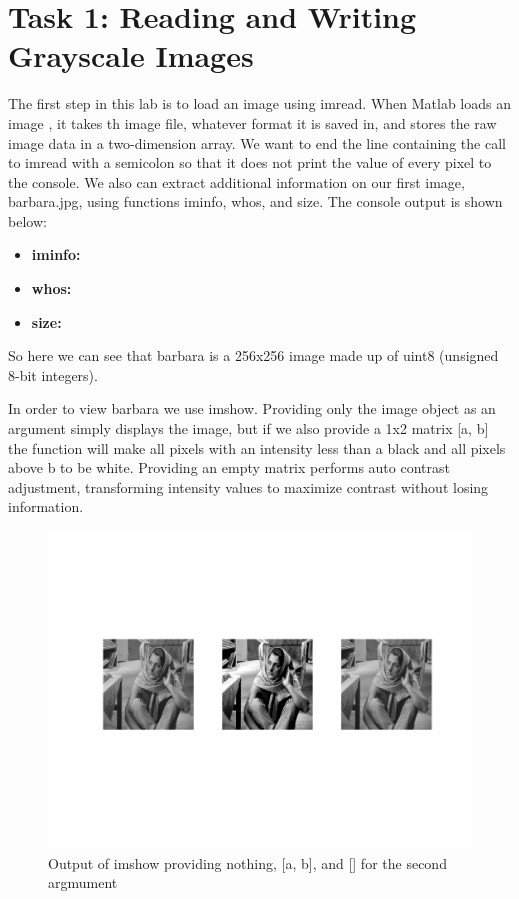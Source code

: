 \section{Task 1: Reading and Writing Grayscale Images}

The first step in this lab is to load an image using imread. When Matlab loads
an image , it takes th image file, whatever format it is saved in, and stores
the raw image data in a two-dimension array. We want to end the line containing
the call to imread with a semicolon so that it does not print the value of every
pixel to the console. We also can extract additional information on our first
image, barbara.jpg, using functions iminfo, whos, and size. The
console output is shown below:

\begin{itemize}

    \item \textbf{iminfo:}
    
    

    \item \textbf{whos:}

    

    \item \textbf{size:}

    

\end{itemize}

So here we can see that barbara is a 256x256 image made up of uint8 (unsigned
8-bit integers).

In order to view barbara we use imshow. Providing only the image object as an
argument simply displays the image, but if we also provide a 1x2 matrix [a, b]
the function will make all pixels with an intensity less than a black and all
pixels above b to be white. Providing an empty matrix performs auto contrast
adjustment, transforming intensity values to maximize contrast without losing
information.

\begin{figure}[H]
    \centering
    \includegraphics[scale=0.5]{imshow}
    \caption{Output of imshow providing nothing, [a, b], and [] for the second
    argmument}
\end{figure}

